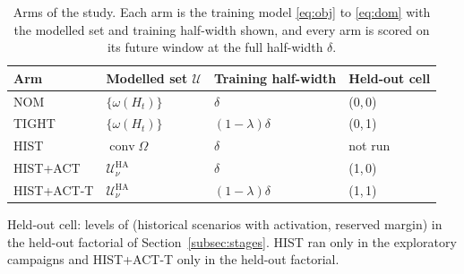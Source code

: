 \begin{table}[htbp]
\centering
\caption{Arms of the study. Each arm is the training model \eqref{eq:obj} to \eqref{eq:dom} with the modelled set and training half-width shown, and every arm is scored on its future window at the full half-width $\delta$.}
\label{tab:arms}
\small
\begin{tabular}{llll}
\toprule
Arm & Modelled set $\mathcal U$ & Training half-width & Held-out cell \\
\midrule
NOM & $\{\omega(H_t)\}$ & $\delta$ & (0,\,0) \\
TIGHT & $\{\omega(H_t)\}$ & $(1-\lambda)\delta$ & (0,\,1) \\
HIST & $\operatorname{conv}\Omega$ & $\delta$ & not run \\
HIST+ACT & $\mathcal U^{\mathrm{HA}}_\nu$ & $\delta$ & (1,\,0) \\
HIST+ACT-T & $\mathcal U^{\mathrm{HA}}_\nu$ & $(1-\lambda)\delta$ & (1,\,1) \\
\bottomrule
\end{tabular}
\par\smallskip
\begin{minipage}{0.92\linewidth}\footnotesize
Held-out cell: levels of (historical scenarios with activation, reserved margin) in the held-out factorial of Section~\ref{subsec:stages}. HIST ran only in the exploratory campaigns and HIST+ACT-T only in the held-out factorial.
\end{minipage}
\end{table}

